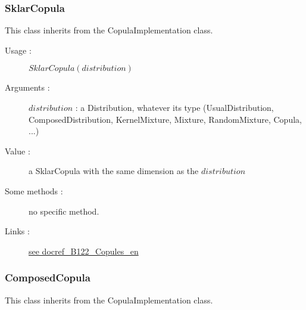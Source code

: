 \newpage \subsubsection{SklarCopula}

This class inherits from the CopulaImplementation class.

\begin{description}

\item[Usage :] $SklarCopula(distribution)$

\item[Arguments :] $distribution$ : a Distribution, whatever its type (UsualDistribution, ComposedDistribution, KernelMixture, Mixture, RandomMixture, Copula, ...)

\item[Value :]  a  SklarCopula with the same dimension as the $distribution$

\item[Some methods :]  no specific method.
\item[Links :]
  \href{./Version/docref_B122_Copules_en.pdf}{see docref\_B122\_Copules\_en}
\end{description}




\newpage        \subsubsection{ComposedCopula}


This class inherits from the CopulaImplementation class.


